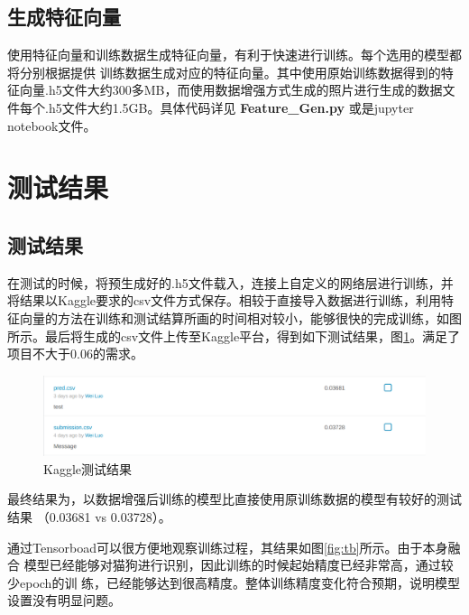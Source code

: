 \documentclass[a4paper,11pt]{article}
\begin{document}
\subsection{生成特征向量}
\label{sec:org9685cf3}
使用特征向量和训练数据生成特征向量，有利于快速进行训练。每个选用的模型都将分别根据提供 训练数据生成对应的特征向量。其中使用原始训练数据得到的特征向量.h5文件大约300多MB，而使用数据增强方式生成的照片进行生成的数据文件每个.h5文件大约1.5GB。具体代码详见 \textbf{Feature\_Gen.py} 或是jupyter notebook文件。

\section{测试结果}
\label{sec:org32561f6}
\subsection{测试结果}
\label{sec:org59eb413}
在测试的时候，将预生成好的.h5文件载入，连接上自定义的网络层进行训练，并将结果以Kaggle要求的csv文件方式保存。相较于直接导入数据进行训练，利用特征向量的方法在训练和测试结算所画的时间相对较小，能够很快的完成训练，如图所示。最后将生成的csv文件上传至Kaggle平台，得到如下测试结果，图\ref{fig:kaggle}。满足了项目不大于0.06的需求。

\begin{figure}[htb]
\centering
\includegraphics[scale=0.25]{./figure/record.png}
\caption{Kaggle测试结果}
\label{fig:kaggle}
\end{figure}

最终结果为，以数据增强后训练的模型比直接使用原训练数据的模型有较好的测试结果
（0.03681 vs 0.03728）。

通过Tensorboad可以很方便地观察训练过程，其结果如图\ref{fig:tb}所示。由于本身融合
模型已经能够对猫狗进行识别，因此训练的时候起始精度已经非常高，通过较少epoch的训
练，已经能够达到很高精度。整体训练精度变化符合预期，说明模型设置没有明显问题。
\end{document}
